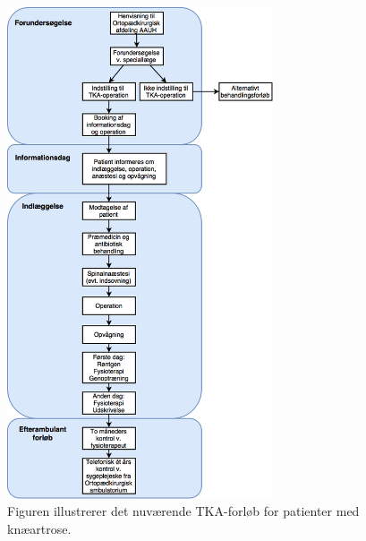 \begin{figure}[H] 
	\begin{center}
		\includegraphics[width=0.7\textwidth]{figures/ORG/nuTKAforlob}
	\end{center}
	\caption{Figuren illustrerer det nuværende TKA-forløb for patienter med knæartrose. \citep{pritka2015}} 
	\label{nuTKAforlob} 
\end{figure} \vspace{-.25cm}


